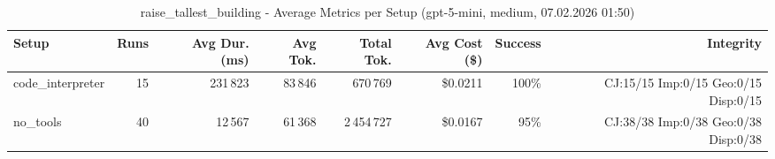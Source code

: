 \documentclass[a4paper,11pt]{article}
\begin{document}
\begin{table}[H]
\centering
\scriptsize
\caption{raise\_tallest\_building - Average Metrics per Setup (gpt-5-mini, medium, 07.02.2026 01:50)}
\label{tab:combined\_raise\_tallest\_building\_metrics\_20260207}
\begin{tabular}{l r r r r r r r}
\toprule
Setup & Runs & Avg Dur. (ms) & Avg Tok. & Total Tok. & Avg Cost (\$) & Success & Integrity \\
\midrule
code\_interpreter & 15 & 231\,823 & 83\,846 & 670\,769 & \$0.0211 & 100\% & CJ:15/15 Imp:0/15 Geo:0/15 Disp:0/15 \\
no\_tools & 40 & 12\,567 & 61\,368 & 2\,454\,727 & \$0.0167 & 95\% & CJ:38/38 Imp:0/38 Geo:0/38 Disp:0/38 \\
\bottomrule
\end{tabular}
\end{table}
\end{document}
